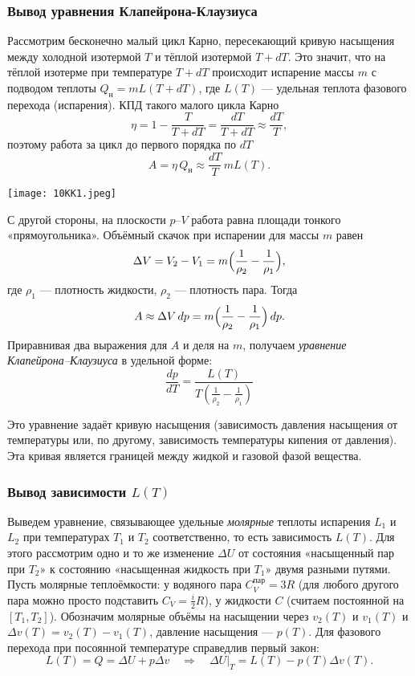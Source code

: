 \documentclass[12pt, a4paper]{article}%
\begin{document}
\subsubsection*{Вывод уравнения Клапейрона-Клаузиуса}
Рассмотрим бесконечно малый цикл Карно, пересекающий кривую насыщения между холодной изотермой \(T\) и тёплой изотермой \(T+dT\). Это значит, что на тёплой изотерме при температуре \(T+dT\) происходит испарение массы \(m\) с подводом теплоты \(Q_{\text{н}}=mL(T+dT)\), где \(L(T)\) — удельная теплота фазового перехода (испарения). КПД такого малого цикла Карно
\[
\eta=1-\frac{T}{T+dT}=\frac{dT}{T+dT}\approx \frac{dT}{T},
\]
поэтому работа за цикл до первого порядка по \(dT\)
\[
A=\eta\,Q_{\text{н}}\approx \frac{dT}{T}\,mL(T).
\]

\begin{center}
\texttt{[image: 10KK1.jpeg]}
\label{fig:mpr}
\end{center}

С другой стороны, на плоскости \(p\)–\(V\) работа равна площади тонкого «прямоугольника». Объёмный скачок при испарении для массы \(m\) равен
\[
\Delta V = V_2-V_1 = m\Bigl(\frac{1}{\rho_2}-\frac{1}{\rho_1}\Bigr),
\]
где $\rho_1$ --- плотность жидкости, $\rho_2$ --- плотность пара.
Тогда
\[
A \approx \Delta V\,dp
= m\Bigl(\frac{1}{\rho_2}-\frac{1}{\rho_1}\Bigr)\,dp.
\]
Приравнивая два выражения для \(A\) и деля на \(m\), получаем \textit{уравнение Клапейрона–Клаузиуса} в удельной форме:
\[
\boxed{\ \frac{dp}{dT}=\frac{L(T)}{T\left(\frac{1}{\rho_2}-\frac{1}{\rho_1}\right)}\ }
\]

Это уравнение задаёт кривую насыщения (зависимость давления насыщения от температуры или, по другому, зависимость температуры кипения от давления). Эта кривая является границей между жидкой и газовой фазой вещества.

\subsubsection*{Вывод зависимости $L(T)$}
Выведем уравнение, связывающее удельные \textit{молярные} теплоты испарения $L_1$ и $L_2$ при 
температурах $T_1$ и $T_2$ соответственно, то есть зависимость $L(T)$. Для 
этого рассмотрим одно и то же изменение \(\Delta U\) от состояния «насыщенный 
пар при \(T_2\)» к состоянию «насыщенная жидкость при \(T_1\)» двумя разными 
путями. Пусть молярные теплоёмкости: у водяного пара \(C_V^{\text{пар}}=3R\) 
(для любого другого пара можно просто подставить $C_V = \frac{i}{2}R$), у жидкости \(C\) (считаем постоянной на \([T_1,T_2]\)). Обозначим молярные объёмы на насыщении через \(v_2(T)\) и \(v_1(T)\) и $\Delta v(T) = v_2(T)-v_1(T)$, давление насыщения — \(p(T)\). Для фазового перехода при посоянной температуре справедлив первый закон:
\[
L(T)=Q=\Delta U+p\Delta v \quad\Longrightarrow\quad \Delta U\big|_{T} = L(T)-p(T)\Delta v(T).
\]
\end{document}
